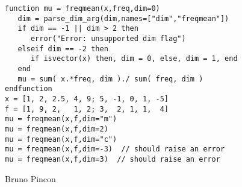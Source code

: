 \begin{examples}

\begin{Verbatim}
function mu = freqmean(x,freq,dim=0)
   dim = parse_dim_arg(dim,names=["dim","freqmean"])
   if dim == -1 || dim > 2 then
      error("Error: unsupported dim flag")
   elseif dim == -2 then
      if isvector(x) then, dim = 0, else, dim = 1, end
   end
   mu = sum( x.*freq, dim )./ sum( freq, dim )
endfunction
x = [1, 2, 2.5, 4, 9; 5, -1, 0, 1, -5]
f = [1, 9, 2,   1, 2; 3,  2, 1, 1,  4]
mu = freqmean(x,f,dim="m")
mu = freqmean(x,f,dim=2)
mu = freqmean(x,f,dim="c")
mu = freqmean(x,f,dim=-3)  // should raise an error
mu = freqmean(x,f,dim=3)  // should raise an error
\end{Verbatim}
\end{examples}

\begin{manseealso}
\end{manseealso}

\begin{authors}
  Bruno Pincon
\end{authors}


